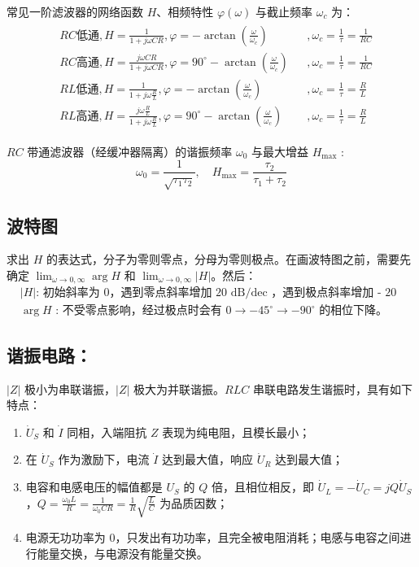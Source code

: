\documentclass[a4paper]{article}  %
\theoremstyle{MyLineTheoremStyle} %
\theoremstyle{MyBlockTheoremStyle} %
\theoremstyle{MySubsubsectionStyle} %
\begin{document}
\begin{multicols*}{4}
常见一阶滤波器的网络函数 $H$、相频特性 $\varphi(\omega)$ 与截止频率 $\omega_c$ 为：
\begin{align*}
\begin{aligned}
&RC \text{低通}, H = \frac{1}{1 + j \omega CR}, 
\varphi = - \arctan \left(\frac{\omega}{\omega_c}\right) &&, \omega_c = \frac{1}{\tau} = \frac{1}{RC}\\
&RC \text{高通}, H = \frac{j \omega CR}{1 + j \omega CR}, 
\varphi = 90^\circ - \arctan \left(\frac{\omega}{\omega_c}\right) &&, \omega_c = \frac{1}{\tau} = \frac{1}{RC}\\
&RL \text{低通}, H = \frac{1}{1 + j \omega \frac{R}{L}}, 
\varphi = - \arctan \left(\frac{\omega}{\omega_c}\right) &&, \omega_c = \frac{1}{\tau} = \frac{R}{L}\\
&RL \text{高通}, H = \frac{j \omega \frac{R}{L}}{1 + j \omega \frac{R}{L}}, 
\varphi = 90^\circ - \arctan \left(\frac{\omega}{\omega_c}\right) &&, \omega_c = \frac{1}{\tau} = \frac{R}{L}
\end{aligned}
\end{align*}

$RC$ 带通滤波器（经缓冲器隔离）的谐振频率 $\omega_0$ 与最大增益 $H_{\max}$ : 
\begin{equation}
\omega_0 = \frac{1}{\sqrt{\tau_1 \tau_2}},\quad 
H_{\max} = \frac{\tau_2}{\tau_1 + \tau_2}
\end{equation}

\subsection{波特图}
求出 $H$ 的表达式，分子为零则零点，分母为零则极点。在画波特图之前，需要先确定 $\lim_{\omega \to 0, \infty} \arg H$ 和  $\lim_{\omega \to 0, \infty} |H|$。然后：
\begin{align}
&\text{$|H|$: 初始斜率为 0，遇到零点斜率增加 20 dB/dec ，遇到极点斜率增加 - 20 dB/dec ；} \\ 
& \text{$\arg H$ : 不受零点影响，经过极点时会有  $0 \to  -45^\circ \to -90^\circ$ 的相位下降。}
\end{align}

\subsection{谐振电路：}

$|Z|$ 极小为串联谐振，$|Z|$ 极大为并联谐振。$RLC$ 串联电路发生谐振时，具有如下特点：
\begin{enumerate}
\item $\dot{U}_S$ 和 $\dot{I}$ 同相，入端阻抗 $Z$ 表现为纯电阻，且模长最小；
\item 在 $\dot{U}_S$ 作为激励下，电流 $\dot{I}$ 达到最大值，响应 $\dot{U}_R$ 达到最大值；
\item 电容和电感电压的幅值都是 $U_S$ 的 $Q$ 倍，且相位相反，即 $\dot{U}_L = -\dot{U}_C = j Q \dot{U}_S$，$Q = \frac{\omega_0 L}{R} = \frac{1}{\omega_0 CR} = \frac{1}{R}\sqrt{\frac{L}{C}}$ 为品质因数；
\item 电源无功功率为 0，只发出有功功率，且完全被电阻消耗；电感与电容之间进行能量交换，与电源没有能量交换。
\end{enumerate}



\end{multicols*}
\end{document}
